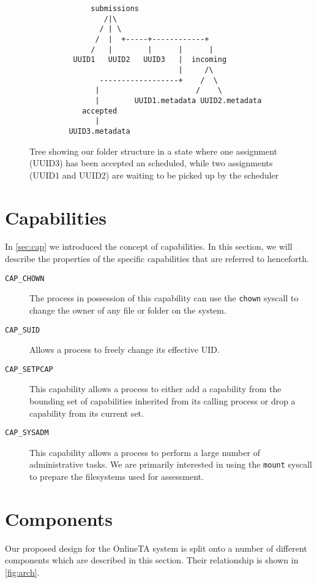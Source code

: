 \begin{figure}
\centering
\begin{verbatim}
              submissions
                 /|\
                / | \
               /  |  +-----+------------+
              /   |        |      |      |
          UUID1   UUID2   UUID3   |  incoming
                                  |     /\
                ------------------+    /  \
               |                      /    \
               |        UUID1.metadata UUID2.metadata
            accepted
               |
         UUID3.metadata
\end{verbatim}
\caption{Tree showing our folder structure in a state where one
  assignment (UUID3) has been accepted an scheduled, while two
  assignments (UUID1 and UUID2) are waiting to be picked up by the scheduler}
\label{fig:filetree}
\end{figure}

\section{Capabilities}
In \cref{sec:cap} we introduced the concept of capabilities. In this
section, we will describe the properties\cite{cap7} of the specific capabilities
that are referred to henceforth.

\begin{description}
\item[\texttt{CAP\_CHOWN}] The process in possession of this
  capability can use the \texttt{chown} syscall to change the owner of
  any file or folder on the system.
\item[\texttt{CAP\_SUID}] Allows a process to freely change its
  effective UID.
\item[\texttt{CAP\_SETPCAP}] This capability allows a process to
  either add a capability from the bounding set of capabilities
  inherited from its calling process or drop a capability from its
  current set.
\item[\texttt{CAP\_SYSADM}] This capability allows a process to
  perform a large number of administrative tasks. We are primarily
  interested in using the \texttt{mount} syscall to prepare the
  filesystems used for assessment.
\end{description}

\section{Components}
Our proposed design for the OnlineTA system is split onto a number of
different components which are described in this section. Their
relationship is shown in \cref{fig:arch}.

